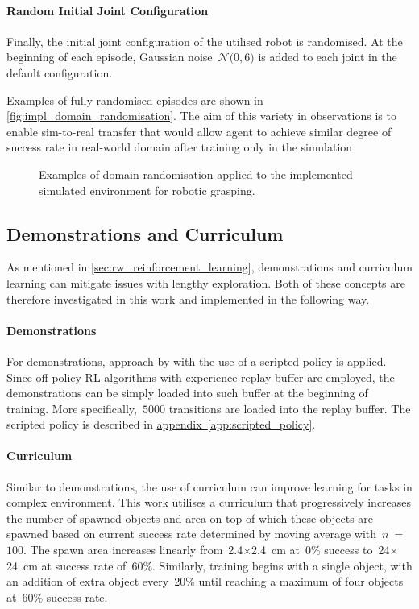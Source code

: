 \paragraph{Random Initial Joint Configuration} Finally, the initial joint configuration of the utilised robot is randomised. At the beginning of each episode, Gaussian noise~\(\mathcal{N}(0, 6\)\textdegree\()\) is added to each joint in the default configuration.

Examples of fully randomised episodes are shown in \autoref{fig:impl_domain_randomisation}. The aim of this variety in observations is to enable sim-to-real transfer that would allow agent to achieve similar degree of success rate in real-world domain after training only in the simulation

\begin{figure}[ht]
    \centering
    \caption{Examples of domain randomisation applied to the implemented simulated environment for robotic grasping.}
    \label{fig:impl_domain_randomisation}
\end{figure}


\subsection{Demonstrations and Curriculum}

As mentioned in \autoref{sec:rw_reinforcement_learning}, demonstrations and curriculum learning can mitigate issues with lengthy exploration. Both of these concepts are therefore investigated in this work and implemented in the following way.

\paragraph{Demonstrations} For demonstrations, approach by \citet{kalashnikov_qt-opt_2018} with the use of a scripted policy is applied. Since off-policy RL algorithms with experience replay buffer are employed, the demonstrations can be simply loaded into such buffer at the beginning of training. More specifically,~\(5000\) transitions are loaded into the replay buffer. The scripted policy is described in \hyperref[app:scripted_policy]{appendix~\ref*{app:scripted_policy}}.

\paragraph{Curriculum} Similar to demonstrations, the use of curriculum can improve learning for tasks in complex environment. This work utilises a curriculum that progressively increases the number of spawned objects and area on top of which these objects are spawned based on current success rate determined by moving average with~\(n\)~=~\(100\). The spawn area increases linearly from~2.4\({\times}\)2.4~cm at~0\% success to~24\({\times}\)24~cm at success rate of~60\%. Similarly, training begins with a single object, with an addition of extra object every~20\% until reaching a maximum of four objects at~60\% success rate.


